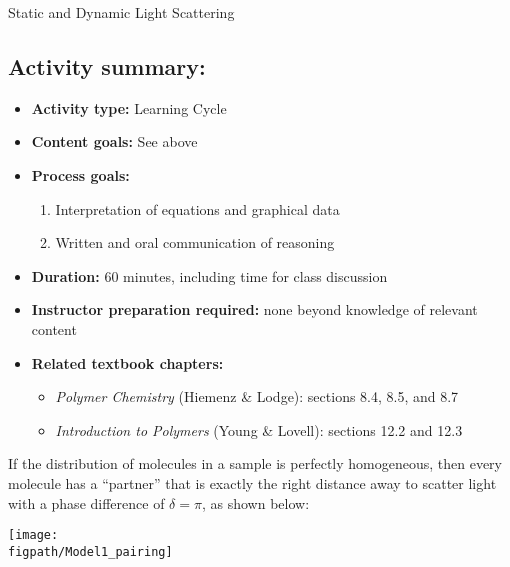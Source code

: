 \begin{activity}{Static and Dynamic Light Scattering}
\begin{instructornotes}
	\subsection*{Activity summary:}
	\begin{itemize}
		\item \textbf{Activity type:} Learning Cycle
		\item \textbf{Content goals:} See above 
		\item \textbf{Process goals:} %
			\begin{enumerate}
				\item Interpretation of equations and graphical data
				\item Written and oral communication of reasoning
			\end{enumerate}
		\item \textbf{Duration:} 60 minutes, including time for class discussion
		\item \textbf{Instructor preparation required:} none beyond knowledge of relevant content
		\item \textbf{Related textbook chapters:}
			\begin{itemize}
				\item \emph{Polymer Chemistry} (Hiemenz \& Lodge): sections 8.4, 8.5, and 8.7
				\item \emph{Introduction to Polymers} (Young \& Lovell): sections 12.2 and 12.3
			\end{itemize}
	\end{itemize}
	
\end{instructornotes}


\begin{model}
	
	If the distribution of molecules in a sample is perfectly homogeneous, then every molecule has a ``partner'' that is exactly the right distance away to scatter light with a phase difference of $\delta = \pi$, as shown below:
	
	\centerline{\texttt{[image: \\figpath/Model1\_pairing]}}
	
\end{model}



\end{activity}
